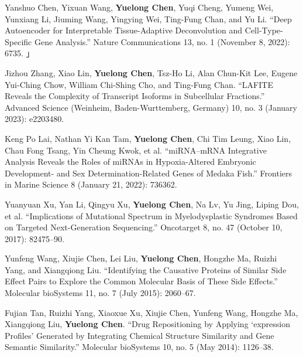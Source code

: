 

\begin{cventries}
\small{

  \begin{cvitems} %
      \item Yanshuo Chen, Yixuan Wang, \textbf{Yuelong Chen}, Yuqi Cheng, Yumeng Wei, Yunxiang Li, Jiuming Wang, Yingying Wei, Ting-Fung Chan, and Yu Li. “Deep Autoencoder for Interpretable Tissue-Adaptive Deconvolution and Cell-Type-Specific Gene Analysis.” Nature Communications 13, no. 1 (November 8, 2022): 6735. 」
      \item Jizhou Zhang, Xiao Lin, \textbf{Yuelong Chen}, Tsz-Ho Li, Alan Chun-Kit Lee, Eugene Yui-Ching Chow, William Chi-Shing Cho, and Ting-Fung Chan. “LAFITE Reveals the Complexity of Transcript Isoforms in Subcellular Fractions.” Advanced Science (Weinheim, Baden-Wurttemberg, Germany) 10, no. 3 (January 2023): e2203480. 
      \item Keng Po Lai, Nathan Yi Kan Tam, \textbf{Yuelong Chen}, Chi Tim Leung, Xiao Lin, Chau Fong Tsang, Yin Cheung Kwok, et al. “miRNA–mRNA Integrative Analysis Reveals the Roles of miRNAs in Hypoxia-Altered Embryonic Development- and Sex Determination-Related Genes of Medaka Fish.” Frontiers in Marine Science 8 (January 21, 2022): 736362. 
      \item Yuanyuan Xu,  Yan Li, Qingyu Xu, \textbf{Yuelong Chen}, Na Lv, Yu Jing, Liping Dou, et al. “Implications of Mutational Spectrum in Myelodysplastic Syndromes Based on Targeted Next-Generation Sequencing.” Oncotarget 8, no. 47 (October 10, 2017): 82475–90. 
      \item Yunfeng Wang, Xiujie Chen, Lei Liu, \textbf{Yuelong Chen}, Hongzhe Ma, Ruizhi Yang, and Xiangqiong Liu. “Identifying the Causative Proteins of Similar Side Effect Pairs to Explore the Common Molecular Basis of These Side Effects.” Molecular bioSystems 11, no. 7 (July 2015): 2060–67.
      \item Fujian Tan,  Ruizhi Yang, Xiaoxue Xu, Xiujie Chen, Yunfeng Wang, Hongzhe Ma, Xiangqiong Liu,  \textbf{Yuelong Chen}. “Drug Repositioning by Applying ‘expression Profiles’ Generated by Integrating Chemical Structure Similarity and Gene Semantic Similarity.” Molecular bioSystems 10, no. 5 (May 2014): 1126–38.
  \end{cvitems}
}







\end{cventries}